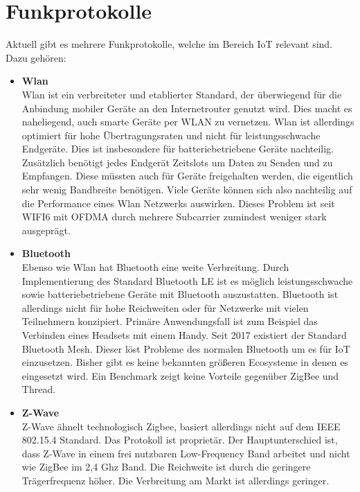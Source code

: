 \section{Funkprotokolle}
Aktuell gibt es mehrere Funkprotokolle, welche im Bereich IoT relevant sind. Dazu gehören:
\begin{itemize}
    \item \textbf{Wlan} \\
    Wlan ist ein verbreiteter und etablierter Standard, der überwiegend für die Anbindung mobiler Geräte an den
    Internetrouter genutzt wird. Dies macht es naheliegend, auch smarte Geräte per WLAN zu vernetzen. Wlan ist allerdings 
    optimiert für hohe Übertragungsraten und nicht für leistungsschwache Endgeräte. Dies ist
    insbesondere für batteriebetriebene Geräte nachteilig. Zusätzlich benötigt jedes Endgerät Zeitslots um Daten zu Senden und zu Empfangen. Diese müssten auch für Geräte freigehalten werden, die eigentlich
    sehr wenig Bandbreite benötigen. Viele Geräte können sich also nachteilig auf die Performance eines Wlan Netzwerks auswirken. Dieses Problem ist seit WIFI6 mit OFDMA durch mehrere Subcarrier 
    zumindest weniger stark ausgeprägt.

    \item \textbf{Bluetooth}\\
    Ebenso wie Wlan hat Bluetooth eine weite Verbreitung. Durch Implementierung 
    des Standard Bluetooth LE ist es möglich leistungsschwache sowie batteriebetriebene Geräte mit Bluetooth auszustatten. Bluetooth
    ist allerdings nicht für hohe Reichweiten oder für Netzwerke mit vielen Teilnehmern konzipiert. Primäre Anwendungsfall ist zum Beispiel das Verbinden eines Headsets mit 
    einem Handy. Seit 2017 existiert der Standard \grqq Bluetooth Mesh\grqq. Dieser löst Probleme des normalen Bluetooth um es für IoT einzusetzen. Bisher gibt es keine bekannten
    größeren Ecosysteme in denen es eingesetzt wird. Ein Benchmark zeigt keine Vorteile gegenüber ZigBee und Thread. \cite{sila}

    \item \textbf{Z-Wave}\\
    Z-Wave \cite{zwave} ähnelt technologisch Zigbee, basiert allerdings nicht auf dem IEEE 802.15.4 Standard. Das Protokoll ist proprietär. Der Hauptunterschied 
    ist, dass Z-Wave in einem frei nutzbaren Low-Frequency Band arbeitet und nicht wie ZigBee im 2,4 Ghz Band. Die Reichweite ist durch die geringere 
    Trägerfrequenz höher. Die Verbreitung am Markt ist allerdings geringer.


\end{itemize}
